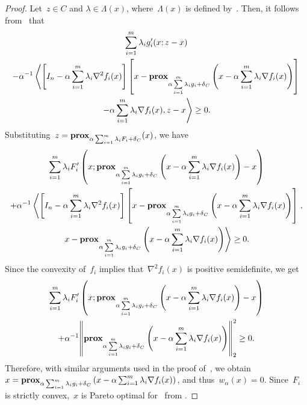 \documentclass[../../main]{subfiles}
\begin{document}
\begin{proof}
    Let~$z \in C$ and $\lambda \in \Lambda(x)$, where~$\Lambda(x)$ is defined by~.
    Then, it follows from~ that
    \begin{multline}
        \sum_{i = 1}^{m} \lambda_i g_i'(x; z - x) \\
        - \alpha^{-1} \left\langle \left[ I_n - \alpha \sum_{i = 1}^{m} \lambda_i \nabla^2 f_i(x) \right] \left[x - \operatorname{\mathbf{prox}}_{\alpha \sum\limits_{i = 1}^{m} \lambda_i g_i + \operatorname{\delta}_C} \left( x - \alpha \sum_{i = 1}^{m} \lambda_i \nabla f_i(x) \right) \right] \right.\\
        \left. - \alpha \sum_{i = 1}^{m} \lambda_i \nabla f_i(x) , z - x \right\rangle \ge 0
        .\end{multline}
    Substituting~$z = \operatorname{\mathbf{prox}}_{\alpha \sum_{i = 1}^{m} \lambda_i F_i + \operatorname{\delta}_C}(x)$, we have
    \begin{multline}
        \sum_{i = 1}^{m} \lambda_i F_i' \left(x; \operatorname{\mathbf{prox}}_{\alpha \sum\limits_{i = 1}^{m} \lambda_i g_i + \operatorname{\delta}_C}\left( x - \alpha \sum_{i = 1}^{m} \lambda_i \nabla f_i(x) \right) - x \right) \\
        + \alpha^{-1} \left\langle \left[ I_n - \alpha \sum_{i = 1}^{m} \lambda_i \nabla^2 f_i(x) \right] \left[ x - \operatorname{\mathbf{prox}}_{\alpha \sum\limits_{i = 1}^{m} \lambda_i g_i + \operatorname{\delta}_C}\left( x - \alpha \sum_{i = 1}^{m} \lambda_i \nabla f_i(x) \right) \right]  \right. , \\
        \left. x - \operatorname{\mathbf{prox}}_{\alpha \sum\limits_{i = 1}^{m} \lambda_i g_i + \operatorname{\delta}_C}\left( x - \alpha \sum_{i = 1}^{m} \lambda_i \nabla f_i(x) \right) \right\rangle \ge 0
        .\end{multline}
    Since the convexity of~$f_i$ implies that~$\nabla^2 f_i(x)$ is positive semidefinite, we get
    \begin{multline}
        \sum_{i = 1}^{m} \lambda_i F_i' \left(x; \prox_{\alpha \sum\limits_{i = 1}^{m} \lambda_i g_i + \indicator_C}\left( x - \alpha \sum_{i = 1}^{m} \lambda_i \nabla f_i(x) \right) - x \right) \\
        + \alpha^{-1} \norm*{\prox_{\alpha \sum\limits_{i = 1}^{m} \lambda_i g_i + \indicator_C}\left( x - \alpha \sum_{i = 1}^{m} \lambda_i \nabla f_i(x) \right)}_2^2 \ge 0
        .\end{multline}
    Therefore, with similar arguments used in the proof of~, we obtain~$x = \operatorname{\mathbf{prox}}_{\alpha \sum_{i = 1}^{m} \lambda_i g_i + \operatorname{\delta}_C}\left( x - \alpha \sum_{i = 1}^{m} \lambda_i \nabla f_i(x) \right)$, and thus~$w_\alpha(x) = 0$.
    Since~$F_i$ is strictly convex,~$x$ is Pareto optimal for~ from .
\end{proof}
\end{document}
